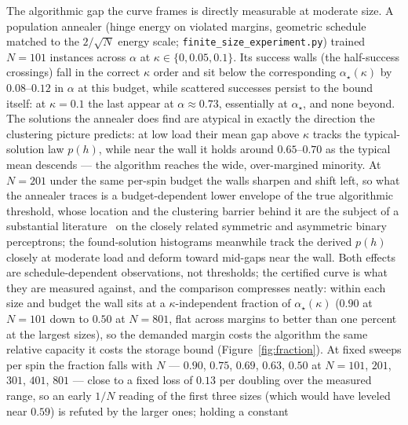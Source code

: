 
The algorithmic gap the curve frames is directly measurable at
moderate size.  A population annealer (hinge energy on violated
margins, geometric schedule matched to the $2/\sqrt N$ energy scale;
\texttt{finite\_size\_experi\-ment.py}) trained $N=101$ instances across
$\alpha$ at $\kappa\in\{0,0.05,0.1\}$.  Its success walls (the half-success crossings) fall in the correct
$\kappa$ order and sit below the corresponding
$\alpha_\star(\kappa)$ by $0.08$--$0.12$ in $\alpha$ at this budget,
while scattered successes persist to the bound itself: at
$\kappa=0.1$ the last appear at $\alpha\approx0.73$, essentially at
$\alpha_\star$, and none beyond.  The solutions the
annealer does find are atypical in exactly the direction the
clustering picture predicts: at low load their mean gap above
$\kappa$ tracks the typical-solution law $p(h)$, while near the wall
it holds around $0.65$--$0.70$ as the typical mean descends --- the
algorithm reaches the wide, over-margined minority.  At $N=201$ under the same
per-spin budget the walls sharpen and shift left, so what the
annealer traces is a budget-dependent lower envelope of the true
algorithmic threshold, whose location and the clustering barrier
behind it are the subject of a substantial
literature~\cite{gamarnik2022algorithms,lsz2024} on the closely
related symmetric and asymmetric binary perceptrons; the
found-solution histograms meanwhile track
the derived $p(h)$ closely at moderate load and deform toward
mid-gaps near the wall.  Both effects are schedule-dependent
observations, not thresholds; the certified curve is what they are
measured against, and the comparison compresses neatly: within each
size and budget the wall sits at a $\kappa$-independent fraction of
$\alpha_\star(\kappa)$ ($0.90$ at $N=101$ down to $0.50$ at $N=801$,
flat across margins to better than one percent at the largest
sizes), so the demanded
margin costs the algorithm the same relative capacity it costs the
storage bound (Figure~\ref{fig:fraction}).  At fixed sweeps per spin
the fraction falls with $N$ --- $0.90$, $0.75$, $0.69$, $0.63$,
$0.50$ at $N=101$, $201$, $301$, $401$, $801$ --- close to a fixed
loss of $0.13$ per doubling over the measured range, so an early
$1/N$ reading of the first three sizes (which would have leveled
near $0.59$) is refuted by the larger ones; holding a constant
